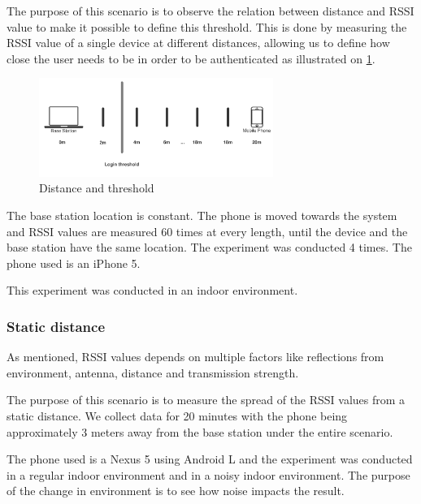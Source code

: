 The purpose of this scenario is to observe the relation between distance and RSSI value to make it possible to  define  this threshold. This is done by measuring the RSSI value of a single device at different distances, allowing us to define how close the user needs to be in order to be authenticated as illustrated on \cref{fig_distance}.

\begin{figure}
	\centering
	\includegraphics[width=3in]{img/distance}
	\caption{ Distance and threshold }
	\label{fig_distance}
\end{figure}

The base station location is constant. The phone is moved towards the system and RSSI values are measured 60 times at every length, until the device and the base station have the same location. The experiment was conducted 4 times. The phone used is an iPhone 5.

This experiment was conducted in an indoor environment.


\subsubsection{Static distance}
\label{section:MovingTowardsSystem}
As mentioned, RSSI values depends on multiple factors like reflections from environment, antenna, distance and transmission strength. 

The purpose of this scenario is to measure the spread of the RSSI values from a static distance. We collect data for 20 minutes with the phone being approximately 3 meters away from the base station under the entire scenario.

The phone used is a Nexus 5 using Android L and the experiment was conducted in a regular indoor environment and in a noisy indoor environment. The purpose of the change in environment is to see how noise impacts the result.


